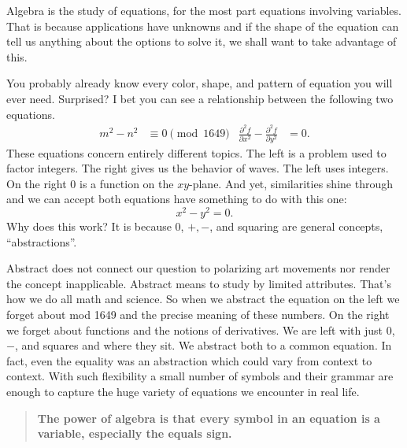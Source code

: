 Algebra is the study of equations, for the most part equations involving variables.
That is because applications have unknowns and if 
the shape of the equation can tell us anything about the 
options to solve it, we shall want to take advantage of this.


You probably already know every color, shape, and pattern of 
equation you will ever need.  Surprised? I bet you 
can see a relationship between the following two equations.
\begin{align*}
    m^2-n^2 & \equiv 0 \pmod{1649} 
    & 
    \frac{\partial^2 f}{\partial x^2}-\frac{\partial^2 f}{\partial y^2} & =0.
\end{align*}
These equations concern entirely different topics.  The left is a problem 
used to factor integers.  The right gives us the behavior of waves.  
The left uses integers.  On the right $0$ is a function on the $xy$-plane.
And yet,  similarities shine through and we can accept both equations 
have something to do with this one:
\[
    x^2-y^2=0.
\]
Why does this work? It is because $0$, $+,-$, and squaring are general concepts,
``abstractions''.  

Abstract does not connect our question to polarizing art movements nor render
the concept inapplicable.  Abstract means to study by limited attributes.
That's how we do all math and science.  So when we abstract the equation on the
left we forget about mod 1649 and the precise meaning of these numbers.  On the
right we forget about functions and the notions of derivatives.  We are left
with just $0$, $-$, and squares and where they sit.  We abstract both to a
common equation. In fact, even the equality was an abstraction which could vary
from context to context. With such flexibility a small number of symbols and
their grammar are enough to capture the huge variety of equations we encounter
in real life.

\begin{quote}
    \textbf{The power of algebra is that every symbol 
    in an equation is a variable, especially the equals sign.}
\end{quote}


